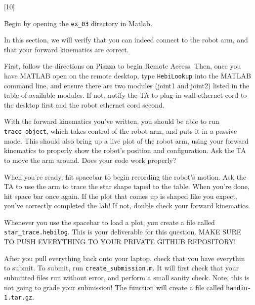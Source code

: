 \documentclass{16384_doc}
\begin{document}
\begin{questions}
    [10]

    Begin by opening the \verb!ex_03! directory in Matlab.

    In this section, we will verify that you can indeed connect to the robot
    arm, and that your forward kinematics are correct.

    First, follow the directions on Piazza to begin Remote Access. Then, once you have 
    MATLAB open on the remote desktop, type \verb!HebiLookup! into the MATLAB 
    command line, and ensure there are two modules (joint1 and joint2) listed 
    in the table of available modules. If not, notify the TA to plug in wall ethernet
    cord to the desktop first and the robot ethernet cord second.

    With the forward kinematics you've written, you should be able to run
    \verb!trace_object!, which takes control of the robot arm, and puts it in
    a passive mode. This should also bring up a live plot of the robot arm,
    using your forward
    kinematics to properly show the robot's position and configuration.  Ask the
    TA to move the arm around.  Does your code work properly?

    When you're ready, hit spacebar to begin recording the robot's motion.  Ask the TA to use
    the arm to trace the star shape taped to the table.  When you're done, hit
    space bar once again.  If the plot that comes up is shaped like you expect,
    you've correctly completed the lab!  If not, double check your forward
    kinematics.

    Whenever you use the spacebar to load a plot, you create a file called
    \verb!star_trace.hebilog!.  This is your deliverable for this question.
    MAKE SURE TO PUSH EVERYTHING TO YOUR PRIVATE GITHUB REPOSITORY!

        After you pull everything back onto your laptop, check that you have everythin to submit.
        To submit, run \verb!create_submission.m!.  It will first check that
        your submitted files run without error, and perform a small sanity
        check. Note, this is not going to grade your submission!  The function
        will create a file called \verb!handin-1.tar.gz!. 
\end{questions}
\end{document}
